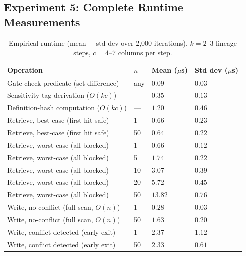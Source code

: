 \documentclass[9pt,twocolumn,twoside]{extarticle}
\begin{document}
\subsection{Experiment 5: Complete Runtime Measurements}
\begin{table}[h]
\centering
\caption{Empirical runtime (mean $\pm$ std dev over 2,000 iterations).
$k{=}2$--$3$ lineage steps, $c{=}4$--$7$ columns per step.}
\label{tab:runtime}
\begin{tabular}{@{}llll@{}}
\toprule
\textbf{Operation} & \textbf{$n$} & \textbf{Mean ($\mu$s)} & \textbf{Std dev ($\mu$s)} \\
\midrule
Gate-check predicate (set-difference) & any  & $0.09$ & $0.03$ \\
Sensitivity-tag derivation ($O(kc)$)  & ---  & $0.35$ & $0.13$ \\
Definition-hash computation ($O(kc)$) & ---  & $1.20$ & $0.46$ \\
\midrule
Retrieve, best-case (first hit safe)  & 1    & $0.66$ & $0.23$ \\
Retrieve, best-case (first hit safe)  & 50   & $0.64$ & $0.22$ \\
Retrieve, worst-case (all blocked)    & 1    & $0.66$ & $0.12$ \\
Retrieve, worst-case (all blocked)    & 5    & $1.74$ & $0.22$ \\
Retrieve, worst-case (all blocked)    & 10   & $3.07$ & $0.39$ \\
Retrieve, worst-case (all blocked)    & 20   & $5.72$ & $0.45$ \\
Retrieve, worst-case (all blocked)    & 50   & $13.82$ & $0.76$ \\
\midrule
Write, no-conflict (full scan, $O(n)$)  & 1  & $0.28$ & $0.03$ \\
Write, no-conflict (full scan, $O(n)$)  & 50 & $1.63$ & $0.20$ \\
Write, conflict detected (early exit)   & 1  & $2.37$ & $1.12$ \\
Write, conflict detected (early exit)   & 50 & $2.33$ & $0.61$ \\
\bottomrule
\end{tabular}
\end{table}
\end{document}
